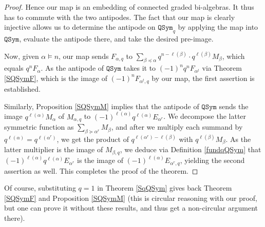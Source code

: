 \documentclass{article}
\theoremstyle{definition}
\begin{document}
\begin{proof}
Hence our map is an embedding of connected graded bi-algebras. It thus has to commute with the two antipodes. The fact that our map is clearly injective allows us to determine the antipode on $\mathtt{QSym}_{q}$ by applying the map into $\mathtt{QSym}$, evaluate the antipode there, and take the desired pre-image.

Now, given $\alpha \vDash n$, our map sends $F_{\alpha,q}$ to $\sum_{\beta\preceq\alpha}q^{n-\ell(\beta)} \cdot q^{\ell(\beta)}M_{\beta}$, which equals $q^{n}F_{\alpha}$. As the antipode of $\mathtt{QSym}$ takes it to $(-1)^{n}q^{n}F_{\alpha^{t}}$ via Theorem \ref{SQSymF}, which is the image of $(-1)^{n}F_{\alpha^{t},q}$ by our map, the first assertion is established.

Similarly, Proposition \ref{SQSymM} implies that the antipode of $\mathtt{QSym}$ sends the image $q^{\ell(\alpha)}M_{\alpha}$ of $M_{\alpha,q}$ to $(-1)^{\ell(\alpha)}q^{\ell(\alpha)}E_{\alpha^{r}}$. We decompose the latter symmetric function as $\sum_{\beta\succeq\alpha^{r}}M_{\beta}$, and after we multiply each summand by $q^{\ell(\alpha)}=q^{\ell(\alpha^{r})}$, we get the product of $q^{\ell(\alpha^{r})-\ell(\beta)}$ with $q^{\ell(\beta)}M_{\beta}$. As the latter multiplier is the image of $M_{\beta,q}$, we deduce via Definition \ref{fundqQSym} that $(-1)^{\ell(\alpha)}q^{\ell(\alpha)}E_{\alpha^{r}}$ is the image of $(-1)^{\ell(\alpha)}E_{\alpha^{r},q}$, yielding the second assertion as well. This completes the proof of the theorem.
\end{proof}
Of course, substituting $q=1$ in Theorem \ref{SqQSym} gives back Theorem \ref{SQSymF} and Proposition \ref{SQSymM} (this is circular reasoning with our proof, but one can prove it without these results, and thus get a non-circular argument there).
\end{document}
